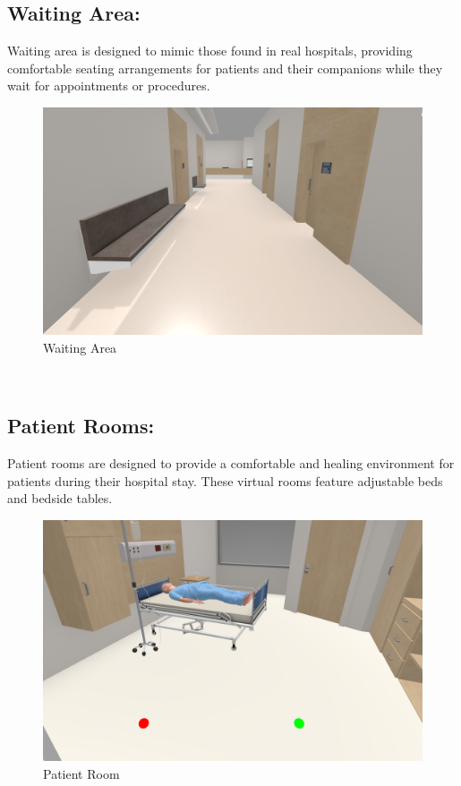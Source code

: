 \subsection{Waiting Area:}	
Waiting area is designed to mimic those found in real hospitals, providing comfortable seating arrangements for patients and their companions while they wait for appointments or procedures.
\begin{figure}[h]
		\centering
		\includegraphics[width=0.7\linewidth]{Images/hospital envoirnment corridor.png}
		\caption{Waiting Area}
\end{figure}
\\
\subsection{Patient Rooms:}	
Patient rooms are designed to provide a comfortable and healing environment for patients during their hospital stay. These virtual rooms feature adjustable beds and bedside tables.
	\begin{figure}[h]
		\centering
		\includegraphics[width=0.7\linewidth]{Images/patient room.png}
		\caption{Patient Room}
		\label{fig:system-diagram}
	\end{figure}	

